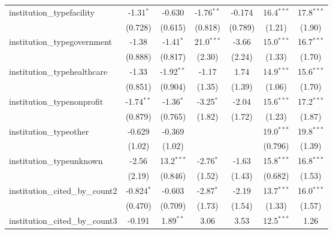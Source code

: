 \begin{tabular}{lcccccc}
   institution\_typefacility             & -1.31$^{*}$   & -0.630        & -1.76$^{**}$  & -0.174        & 16.4$^{***}$  & 17.8$^{***}$\\   
                                         & (0.728)       & (0.615)       & (0.818)       & (0.789)       & (1.21)        & (1.90)\\   
   institution\_typegovernment           & -1.38         & -1.41$^{*}$   & 21.0$^{***}$  & -3.66         & 15.0$^{***}$  & 16.7$^{***}$\\   
                                         & (0.888)       & (0.817)       & (2.30)        & (2.24)        & (1.33)        & (1.70)\\   
   institution\_typehealthcare           & -1.33         & -1.92$^{**}$  & -1.17         & 1.74          & 14.9$^{***}$  & 15.6$^{***}$\\   
                                         & (0.851)       & (0.904)       & (1.35)        & (1.39)        & (1.06)        & (1.70)\\   
   institution\_typenonprofit            & -1.74$^{**}$  & -1.36$^{*}$   & -3.25$^{*}$   & -2.04         & 15.6$^{***}$  & 17.2$^{***}$\\   
                                         & (0.879)       & (0.765)       & (1.82)        & (1.72)        & (1.23)        & (1.87)\\   
   institution\_typeother                & -0.629        & -0.369        &               &               & 19.0$^{***}$  & 19.8$^{***}$\\   
                                         & (1.02)        & (1.02)        &               &               & (0.796)       & (1.39)\\   
   institution\_typeunknown              & -2.56         & 13.2$^{***}$  & -2.76$^{*}$   & -1.63         & 15.8$^{***}$  & 16.8$^{***}$\\   
                                         & (2.19)        & (0.846)       & (1.52)        & (1.43)        & (0.682)       & (1.53)\\   
   institution\_cited\_by\_count2        & -0.824$^{*}$  & -0.603        & -2.87$^{*}$   & -2.19         & 13.7$^{***}$  & 16.0$^{***}$\\   
                                         & (0.470)       & (0.709)       & (1.73)        & (1.54)        & (1.33)        & (1.57)\\   
   institution\_cited\_by\_count3        & -0.191        & 1.89$^{**}$   & 3.06          & 3.53          & 12.5$^{***}$  & 1.26\\   

\end{tabular}
